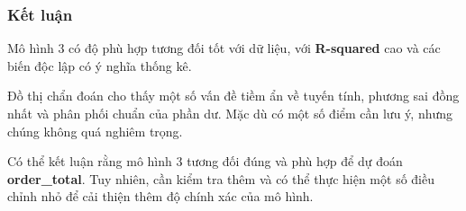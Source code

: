 \subsubsection{Kết luận}

Mô hình 3 có độ phù hợp tương đối tốt với dữ liệu, với \textbf{R-squared} cao và các biến độc lập có ý nghĩa thống kê.

Đồ thị chẩn đoán cho thấy một số vấn đề tiềm ẩn về tuyến tính, phương sai đồng nhất và phân phối chuẩn của phần dư. Mặc dù có một số điểm cần lưu ý, nhưng chúng không quá nghiêm trọng.

Có thể kết luận rằng mô hình 3 tương đối đúng và phù hợp để dự đoán \textbf{order\_total}. Tuy nhiên, cần kiểm tra thêm và có thể thực hiện một số điều chỉnh nhỏ để cải thiện thêm độ chính xác của mô hình.







